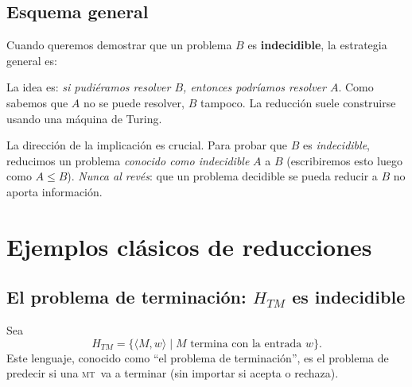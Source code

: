 \documentclass[11pt,a4paper]{article}
\theoremstyle{definicion}
\newcommand{\MT}{\textsc{mt}}
\newcommand{\enc}[1]{\langle #1 \rangle}
\begin{document}
\subsection{Esquema general}

Cuando queremos demostrar que un problema $B$ es \textbf{indecidible}, la estrategia general es:

\begin{center}
\end{center}

La idea es: \emph{si pudiéramos resolver $B$, entonces podríamos resolver $A$}. Como sabemos que $A$ no se puede resolver, $B$ tampoco. La reducción suele construirse usando una máquina de Turing.

\begin{intuicion}
La dirección de la implicación es crucial. Para probar que $B$ es \emph{indecidible}, reducimos un problema \emph{conocido como indecidible} $A$ a $B$ (escribiremos esto luego como $A \leq B$). \emph{Nunca al revés}: que un problema decidible se pueda reducir a $B$ no aporta información.
\end{intuicion}

\section{Ejemplos clásicos de reducciones}

\subsection{El problema de terminación: $H_{TM}$ es indecidible}

Sea
\[
H_{TM} = \{ \enc{M, w} \mid M \text{ termina con la entrada } w \}.
\]
Este lenguaje, conocido como ``el problema de terminación'', es el problema de predecir si una \MT\ va a terminar (sin importar si acepta o rechaza).
\end{document}
